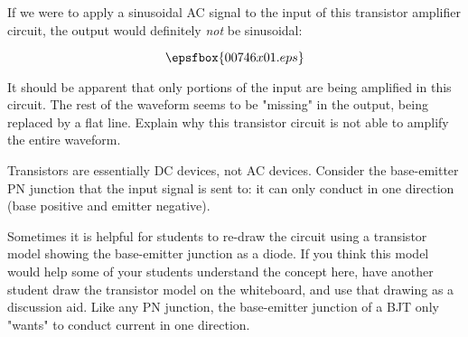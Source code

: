 

If we were to apply a sinusoidal AC signal to the input of this transistor amplifier circuit, the output would definitely {\it not} be sinusoidal:

$$\epsfbox{00746x01.eps}$$

It should be apparent that only portions of the input are being amplified in this circuit.  The rest of the waveform seems to be "missing" in the output, being replaced by a flat line.  Explain why this transistor circuit is not able to amplify the entire waveform.







Transistors are essentially DC devices, not AC devices.  Consider the base-emitter PN junction that the input signal is sent to: it can only conduct in one direction (base positive and emitter negative).







Sometimes it is helpful for students to re-draw the circuit using a transistor model showing the base-emitter junction as a diode.  If you think this model would help some of your students understand the concept here, have another student draw the transistor model on the whiteboard, and use that drawing as a discussion aid.  Like any PN junction, the base-emitter junction of a BJT only "wants" to conduct current in one direction.




